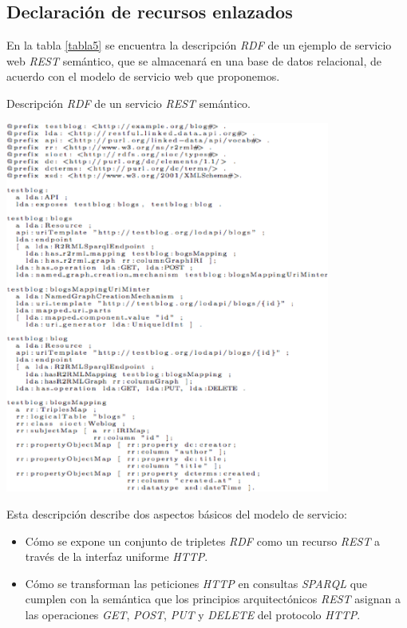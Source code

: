 \subsection{Declaraci\'on de recursos enlazados}

En la tabla \ref{tabla5} se encuentra la descripci\'on \textit{RDF} de un ejemplo de servicio web \textit{REST} sem\'antico, que se almacenar\'a en una base de datos relacional, de acuerdo con el modelo de servicio web que proponemos.\\

\begin{table}
\vspace{2.4in}
\caption{Descripci\'on \textit{RDF} de un servicio \textit{REST} sem\'antico.}
\includegraphics[width=0.8\textwidth]{tabla5}
\label{tabla5}
\end{table}

Esta descripci\'on describe dos aspectos b\'asicos del modelo de servicio:

\begin{itemize}
\item C\'omo se expone un conjunto de tripletes \textit{RDF} como un recurso \textit{REST} a trav\'es de la interfaz uniforme \textit{HTTP}.
\item C\'omo se transforman las peticiones \textit{HTTP} en consultas \textit{SPARQL} que cumplen con la sem\'antica que los principios arquitect\'onicos \textit{REST} asignan a las operaciones \textit{GET}, \textit{POST}, \textit{PUT} y \textit{DELETE} del protocolo \textit{HTTP}.
\end{itemize}

